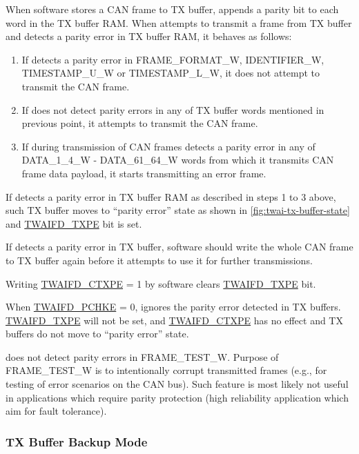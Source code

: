 \documentclass[main\_\_EN.tex]{subfiles}
\begin{document}
When software stores a CAN frame to TX buffer, \modulename{} appends a parity bit to each word in the TX buffer RAM. When \modulename{} attempts to transmit a frame from TX buffer and detects a parity error in TX buffer RAM, it behaves as follows:

\begin{enumerate}
    \item If \modulename{} detects a parity error in FRAME\_FORMAT\_W, IDENTIFIER\_W, TIMESTAMP\_U\_W or TIMESTAMP\_L\_W, it does not attempt to transmit the CAN frame.
    \item If \modulename{} does not detect parity errors in any of TX buffer words mentioned in previous point, it attempts to transmit the CAN frame.
    \item If during transmission of CAN frames \modulename{} detects a parity error in any of DATA\_1\_4\_W - DATA\_61\_64\_W words from which it transmits CAN frame data payload, it starts transmitting an error frame.
\end{enumerate}

If \modulename{} detects a parity error in TX buffer RAM as described in steps 1 to 3 above, such TX buffer moves to ``parity error'' state as shown in \ref{fig:twai-tx-buffer-state} and \hyperref[fielddesc:TWAIFDTXPE]{TWAIFD\_TXPE} bit is set.

If \modulename{} detects a parity error in TX buffer, software should write the whole CAN frame to TX buffer again before it attempts to use it for further transmissions.

Writing \hyperref[fielddesc:TWAIFDCTXPE]{TWAIFD\_CTXPE} = 1 by software clears \hyperref[fielddesc:TWAIFDTXPE]{TWAIFD\_TXPE} bit.

When \hyperref[fielddesc:TWAIFDPCHKE]{TWAIFD\_PCHKE} = 0, \modulename{} ignores the parity error detected in TX buffers. \hyperref[fielddesc:TWAIFDTXPE]{TWAIFD\_TXPE} will not be set, and \hyperref[fielddesc:TWAIFDCTXPE]{TWAIFD\_CTXPE} has no effect and TX buffers do not move to ``parity error'' state.


\modulename{} does not detect parity errors in FRAME\_TEST\_W. Purpose of FRAME\_TEST\_W is to intentionally corrupt transmitted frames (e.g., for testing of error scenarios on the CAN bus). Such feature is most likely not useful in applications which require parity protection (high reliability application which aim for fault tolerance).



\subsubsection{TX Buffer Backup Mode}\label{sec:twai-func-tx-buffer-backup}
\end{document}
